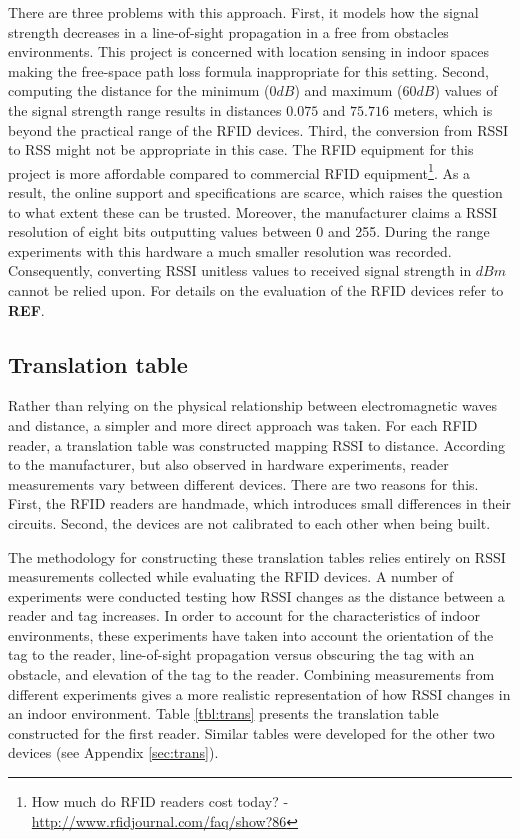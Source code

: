 There are three problems with this approach. First, it models how the signal strength decreases in a line-of-sight propagation in a free from obstacles environments. This project is concerned with location sensing in indoor spaces making the free-space path loss formula inappropriate for this setting. Second, computing the distance for the minimum ($0dB$) and maximum ($60dB$) values of the signal strength range results in distances $0.075$ and $75.716$ meters, which is beyond the practical range of the RFID devices. Third, the conversion from RSSI to RSS might not be appropriate in this case. The RFID equipment for this project is more affordable compared to commercial RFID equipment\footnote{How much do RFID readers cost today? - \url{http://www.rfidjournal.com/faq/show?86}}. As a result, the online support and specifications are scarce, which raises the question to what extent these can be trusted. Moreover, the manufacturer claims a RSSI resolution of eight bits outputting values between 0 and 255. During the range experiments with this hardware a much smaller resolution was recorded. Consequently, converting RSSI unitless values to received signal strength in $dBm$ cannot be relied upon. For details on the evaluation of the RFID devices refer to \textbf{REF}. 

\subsection{Translation table}
\label{subsec:transtbl}

Rather than relying on the physical relationship between electromagnetic waves and distance, a simpler and more direct approach was taken. For each RFID reader, a translation table was constructed mapping RSSI to distance. According to the manufacturer, but also observed in hardware experiments, reader measurements vary between different devices. There are two reasons for this. First, the RFID readers are handmade, which introduces small differences in their circuits. Second, the devices are not calibrated to each other when being built.   

The methodology for constructing these translation tables relies entirely on RSSI measurements collected while evaluating the RFID devices. A number of experiments were conducted testing how RSSI changes as the distance between a reader and tag increases. In order to account for the characteristics of indoor environments, these experiments have taken into account the orientation of the tag to the reader, line-of-sight propagation versus obscuring the tag with an obstacle, and elevation of the tag to the reader. Combining measurements from different experiments gives a more realistic representation of how RSSI changes in an indoor environment. Table \ref{tbl:trans} presents the translation table constructed for the first reader. Similar tables were developed for the other two devices (see Appendix \ref{sec:trans}).

